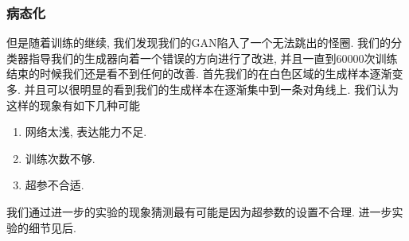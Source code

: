 \documentclass[lang=cn,11pt]{elegantpaper}
\begin{document}

\subsubsection{病态化}

但是随着训练的继续, 我们发现我们的GAN陷入了一个无法跳出的怪圈. 我们的分类器指导我们的生成器向着一个错误的方向进行了改进, 并且一直到60000次训练结束的时候我们还是看不到任何的改善. 首先我们的在白色区域的生成样本逐渐变多. 并且可以很明显的看到我们的生成样本在逐渐集中到一条对角线上. 我们认为这样的现象有如下几种可能

\begin{enumerate}
	\item 网络太浅, 表达能力不足.
	\item 训练次数不够.
	\item 超参不合适.
\end{enumerate}

我们通过进一步的实验的现象猜测最有可能是因为超参数的设置不合理. 进一步实验的细节见后.
\end{document}
